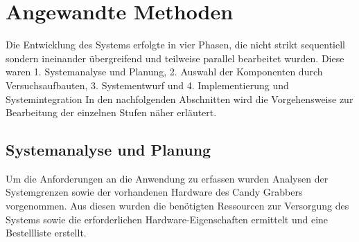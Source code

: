 \documentclass[BMR,Bachelor,ngerman]{twbook}%
\begin{document}
%
\clearpage
\chapter{Angewandte Methoden}
Die Entwicklung des Systems erfolgte in vier Phasen, die nicht strikt sequentiell sondern ineinander übergreifend und teilweise parallel bearbeitet wurden. Diese waren 1. Systemanalyse und Planung, 2. Auswahl der Komponenten durch Versuchsaufbauten, 3. Systementwurf und 4. Implementierung und Systemintegration
In den nachfolgenden Abschnitten wird die Vorgehensweise zur Bearbeitung der einzelnen Stufen näher erläutert.
%
\section{Systemanalyse und Planung}
Um die Anforderungen an die Anwendung zu erfassen wurden Analysen der Systemgrenzen sowie der vorhandenen Hardware des Candy Grabbers vorgenommen. Aus diesen wurden die benötigten Ressourcen zur Versorgung des Systems sowie die erforderlichen Hardware-Eigenschaften ermittelt und eine Bestellliste erstellt. %
\end{document}
